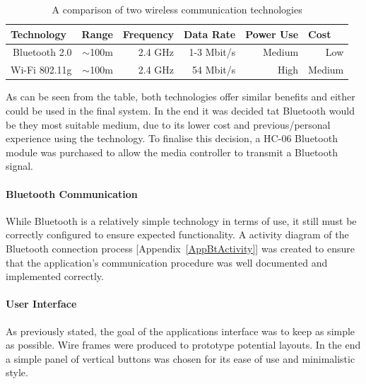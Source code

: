 \documentclass{article}
\begin{document}
			\begin{table}[h]
				\centering
				\caption{A comparison of two wireless communication technologies}
				\label{btWiFiComparison}
				\begin{tabular}{|r|r|r|r|r|r|}
					\hline
					\multicolumn{1}{|l|}{Technology} & \multicolumn{1}{l|}{Range} & \multicolumn{1}{l|}{Frequency} & \multicolumn{1}{l|}{Data Rate} & \multicolumn{1}{l|}{Power Use} & \multicolumn{1}{l|}{Cost} \\ \hline
					Bluetooth 2.0                    & $\sim$100m                 & 2.4 GHz                        & 1-3 Mbit/s                     & Medium                         & Low                       \\
					Wi-Fi 802.11g                     & $\sim$100m                 & 2.4 GHz                        & 54 Mbit/s                      & High                           & Medium                    \\ \hline
				\end{tabular}
			\end{table}
			
			\noindent
			As can be seen from the table, both technologies offer similar benefits and either could be used in the final system. In the end it was decided tat Bluetooth would be they most suitable medium, due to its lower cost and previous/personal experience using the technology. To finalise this decision, a HC-06 Bluetooth module \cite{HC06DataSheet:online} was purchased to allow the media controller to transmit a Bluetooth signal.
			
			\paragraph{Bluetooth Communication}
			While Bluetooth is a relatively simple technology in terms of use, it still must be correctly configured to ensure expected functionality. A activity diagram of the Bluetooth connection process [Appendix~\ref{AppBtActivity}] was created to ensure that the application's communication procedure was well documented and implemented correctly.
			
			\paragraph{User Interface}
			As previously stated, the goal of the applications interface was to keep as simple as possible. Wire frames were produced to prototype potential layouts. In the end a simple panel of vertical buttons was chosen for its ease of use and minimalistic style.\\
			
\end{document}
